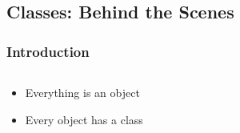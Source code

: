 \subsection{Classes: Behind the Scenes}
\begin{frame}[fragile]\frametitle{Introduction}


\begin{columns}[c] 

\begin{column}{4cm}
\begin{itemize}

\item Everything is an object
\item Every object has a class

\end{itemize}
\end{column}


\begin{column}{7cm}

\end{column}

\end{columns}

\end{frame}




